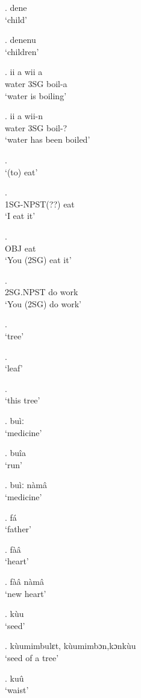 \documentclass{assets/fieldnotes}
\begin{document}
\ex. dene \\
`child'

\ex. denenu \\
`children'


\exg. ii a wii a \\ 
water 3SG boil-a \\
`water is boiling' 

\exg. ii a wii-n \\
water 3SG boil-? \\
`water has been boiled'


\ex.  \\
`(to) eat'

\exg.  \\
1SG-NPST(??) eat \\
`I eat it'

\exg.  \\
OBJ eat \\
`You (2SG) eat it'

\exg.  \\
2SG.NPST do work \\
`You (2SG) do work'

\ex.  \\
`tree'

\ex.  \\
`leaf'

\ex.  \\
`this tree'

\ex. buìː \\
`medicine'

\ex. buîa \\
`run'

\ex. buìː nàmâ \\
`medicine'

\ex. fá \\
`father'

\ex. fàâ \\
`heart'

\ex. fàâ nàmâ\\
`new heart'

\ex. kùu \\
`seed'

\ex. kùumimbulɛt, kùumimbɔn,kɔnkùu \\
`seed of a tree'

\ex. kuû \\
`waist'
\end{document}
